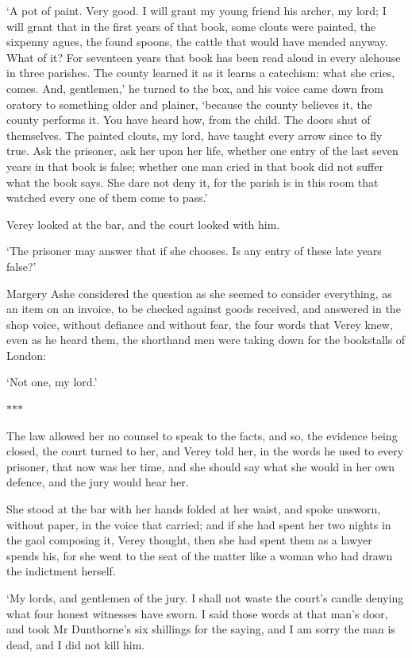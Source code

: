 \documentclass[11pt]{article}
\newcommand{\scenebreak}{%
  \par\vspace{1.1\baselineskip}%
  {\centering $\ast$\quad$\ast$\quad$\ast$\par}%
  \vspace{1.1\baselineskip}\noindent}
\begin{document}
`A pot of paint. Very good. I will grant my young friend his archer, my lord; I will grant that in the first years of that book, some clouts were painted, the sixpenny agues, the found spoons, the cattle that would have mended anyway. What of it? For seventeen years that book has been read aloud in every alehouse in three parishes. The county learned it as it learns a catechism: what she cries, comes. And, gentlemen,' he turned to the box, and his voice came down from oratory to something older and plainer, `because the county believes it, the county performs it. You have heard how, from the child. The doors shut of themselves. The painted clouts, my lord, have taught every arrow since to fly true. Ask the prisoner, ask her upon her life, whether one entry of the last seven years in that book is false; whether one man cried in that book did not suffer what the book says. She dare not deny it, for the parish is in this room that watched every one of them come to pass.'

Verey looked at the bar, and the court looked with him.

`The prisoner may answer that if she chooses. Is any entry of these late years false?'

Margery Ashe considered the question as she seemed to consider everything, as an item on an invoice, to be checked against goods received, and answered in the shop voice, without defiance and without fear, the four words that Verey knew, even as he heard them, the shorthand men were taking down for the bookstalls of London:

`Not one, my lord.'

\scenebreak
\noindent The law allowed her no counsel to speak to the facts, and so, the evidence being closed, the court turned to her, and Verey told her, in the words he used to every prisoner, that now was her time, and she should say what she would in her own defence, and the jury would hear her.

She stood at the bar with her hands folded at her waist, and spoke unsworn, without paper, in the voice that carried; and if she had spent her two nights in the gaol composing it, Verey thought, then she had spent them as a lawyer spends his, for she went to the seat of the matter like a woman who had drawn the indictment herself.

`My lords, and gentlemen of the jury. I shall not waste the court's candle denying what four honest witnesses have sworn. I said those words at that man's door, and took Mr Dunthorne's six shillings for the saying, and I am sorry the man is dead, and I did not kill him.
\end{document}
